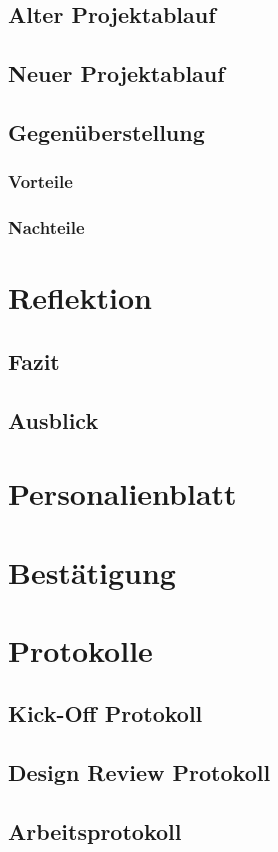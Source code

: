 \documentclass[
11pt, %
a4paper, %
BCOR25mm, %
DIV14, %
footsepline = false, %
headsepline, %
twoside, %
openright,
abstracton, %
listof=totocnumbered, %
bibliography=totocnumbered %
]{scrreprt}
\begin{document}
  \section{Alter Projektablauf}
  \section{Neuer Projektablauf}
  \section{Gegenüberstellung}
  \subsection{Vorteile}
  \subsection{Nachteile}
  
  \chapter{Reflektion}
  \section{Fazit}
  \section{Ausblick}
  
  \appendix
  
  \chapter{Personalienblatt}
  
  
  \chapter{Bestätigung}
  
  
  \listoffigures
  \listoftables
  
  
  
  
  \chapter{Protokolle}
  \section{Kick-Off Protokoll}
  \section{Design Review Protokoll}
  \section{Arbeitsprotokoll}
\end{document}
